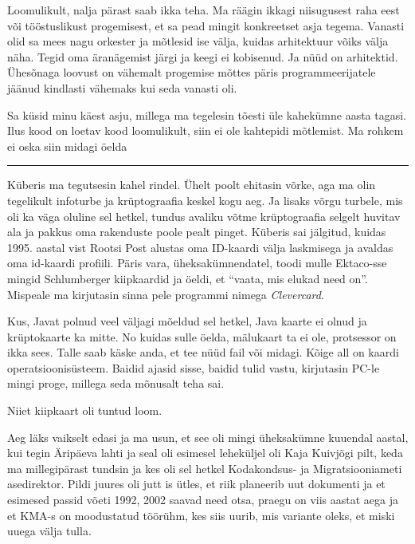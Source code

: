 
Loomulikult, nalja pärast saab ikka teha. Ma räägin ikkagi niisugusest raha eest või tööstuslikust progemisest, et sa pead mingit konkreetset asja tegema. Vanasti olid sa mees nagu orkester ja mõtlesid ise välja, kuidas arhitektuur võiks välja näha. Tegid  oma äranägemist järgi ja keegi ei kobisenud. Ja nüüd on arhitektid. Ühesõnaga loovust on vähemalt progemise mõttes päris programmeerijatele jäänud kindlasti vähemaks kui seda vanasti oli. 


Sa küsid minu käest asju, millega ma tegelesin tõesti üle kahekümne aasta tagasi. Ilus kood on loetav kood loomulikult, siin ei ole kahtepidi mõtlemist. Ma rohkem ei oska siin midagi öelda

\bigskip
\noindent\rule{.3\textwidth}{.7pt}
\bigskip


Küberis ma tegutsesin kahel rindel. Ühelt poolt ehitasin võrke, aga ma olin tegelikult infoturbe ja krüptograafia keskel kogu aeg. Ja lisaks võrgu turbele, mis oli ka väga oluline sel hetkel, tundus avaliku võtme krüptograafia selgelt huvitav ala ja pakkus oma rakenduste poole pealt pinget. Küberis sai jälgitud, kuidas 1995. aastal vist Rootsi Post alustas oma ID-kaardi välja laskmisega ja avaldas oma id-kaardi profiili.  Päris vara, üheksakümnendatel, toodi mulle Ektaco-sse mingid Schlumberger kiipkaardid ja öeldi, et \enquote{vaata, mis elukad need on}. Mispeale ma kirjutasin sinna pele programmi nimega \emph{Clevercard}.


Kus, Javat polnud veel väljagi mõeldud sel hetkel, Java kaarte  ei olnud ja krüptokaarte ka mitte. No kuidas sulle öelda, mälukaart ta ei ole,  protsessor on ikka sees. Talle saab käske anda, et tee nüüd fail või midagi. Kõige all on kaardi operatsioonisüsteem. Baidid ajasid sisse, baidid tulid vastu, kirjutasin PC-le  mingi proge, millega seda mõnusalt teha sai. 

Niiet kiipkaart oli tuntud loom. 

Aeg läks vaikselt edasi ja ma usun, et see oli mingi üheksakümne kuuendal aastal, kui tegin Äripäeva lahti ja seal oli esimesel leheküljel oli Kaja Kuivjõgi pilt, keda ma millegipärast tundsin ja kes oli sel hetkel Kodakondsus- ja Migratsiooniameti asedirektor. Pildi juures oli jutt is ütles, et riik planeerib uut dokumenti ja et esimesed passid võeti 1992, 2002 saavad need otsa, praegu on viis aastat aega ja et KMA-s on moodustatud töörühm, kes siis uurib, mis variante oleks, et miski uuega välja tulla. 

